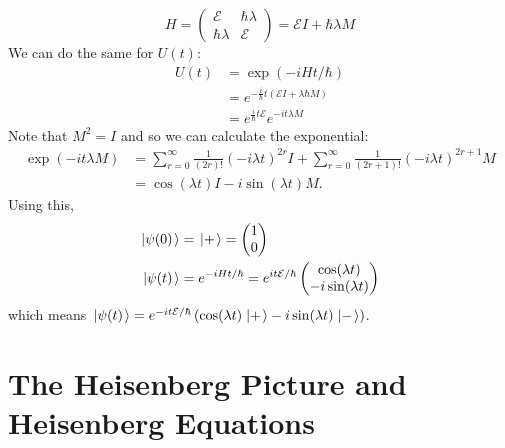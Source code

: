 \documentclass[../Main.tex]{subfiles}
\begin{document}
\begin{example}
    \begin{equation*}
        H = \begin{pmatrix}
            \mathcal{E} & \hbar \lambda \\
            \hbar\lambda & \mathcal{E}
        \end{pmatrix}
        = \mathcal{E} I + \hbar\lambda M
    \end{equation*}
    We can do the same for $U(t)$:
    \begin{align*}
        U(t) &= \exp\left(-iHt / \hbar\right) \\
        &= e^{-\frac{i}{\hbar}t(\mathcal{E} I + \lambda \hbar M)} \\
        &= e^{\frac{i}{\hbar} t \mathcal{E}} e^{-it\lambda M}
    \end{align*}
    Note that $M^2 = I$ and so we can calculate the exponential:
    \begin{align*}
        \exp\left(-it\lambda M\right) &= \sum_{r=0}^{\infty} \frac{1}{(2r)!} \left(-i\lambda t\right)^{2r} I + \sum_{r=0}^{\infty} \frac{1}{(2r+1)!} \left(-i\lambda t\right)^{2r+1} M \\
        &= \cos(\lambda t) I - i \sin(\lambda t) M.
    \end{align*}
    Using this,
    \begin{align*}
        \left.\left|\psi(0)\right.\right\rangle &= \left.\left|+\right.\right\rangle = \begin{pmatrix}1 \\ 0\end{pmatrix} \\
        \left.\left|\psi(t)\right.\right\rangle &= e^{-iH t / \hbar} = e^{it\mathcal{E} / \hbar} \begin{pmatrix}\cos(\lambda t) \\ -i\sin(\lambda t)\end{pmatrix}
    \end{align*}
    which means $\left.\left|\psi(t)\right.\right\rangle = e^{-it\mathcal{E} / \hbar} \left(\cos(\lambda t) \left.\left|+\right.\right\rangle - i \sin(\lambda t) \left.\left|-\right.\right\rangle\right)$.
\end{example}
\section{The Heisenberg Picture and Heisenberg Equations}
\end{document}
